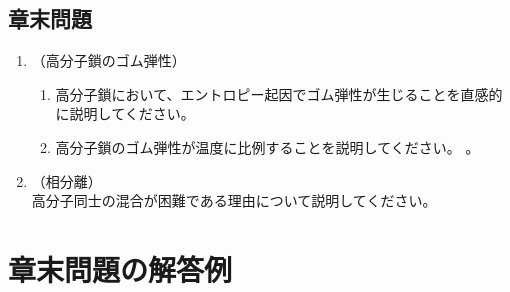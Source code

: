 \documentclass[a4paper,11pt]{ltjsarticle}
\begin{document}
\subsection{章末問題}

	\begin{enumerate}
	\item
	（高分子鎖のゴム弾性）\\
		\vspace{-5mm}
		\begin{enumerate}
		\item
		\label{it:5-1}
		高分子鎖において、エントロピー起因でゴム弾性が生じることを直感的に説明してください。

		\item
		\label{it:5-2}
		高分子鎖のゴム弾性が温度に比例することを説明してください。
。
		\end{enumerate}
	\item
	（相分離）\\
	\label{it:5-3}
	高分子同士の混合が困難である理由について説明してください。

	\end{enumerate}

\newpage

\section{章末問題の解答例}
\end{document}
